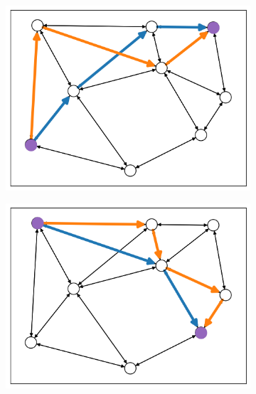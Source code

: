 \documentclass[a4paper,oneside]{article}
\begin{document}
\begin{figure}[h]
  \begin{subfigure}[t]{0.33\textwidth}
    \includegraphics[width=\textwidth]{user0_with_protection.png}
  \end{subfigure}
  \begin{subfigure}[t]{0.33\textwidth}
    \includegraphics[width=\textwidth]{user1_with_protection.png}
  \end{subfigure}
  \begin{subfigure}[t]{0.33\textwidth}

\end{subfigure}
\end{figure}
\end{document}
